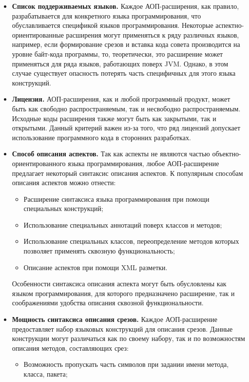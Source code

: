 \begin{itemize}
\item \textbf{Список поддерживаемых языков.}
  Каждое АОП-расширения, как правило, разрабатывается для конкретного языка
  программирования, что обуславливается спецификой языков программирования.
  Некоторые аспектно-ориентированные расширения могут применяться
  к ряду различных языков, например, если формирование срезов и вставка кода
  совета производится на уровне байт-кода программы, то, теоретически, это
  расширение может применяться для ряда языков, работающих поверх JVM.
  Однако, в этом случае существует опасность потерять часть специфичных для
  этого языка конструкций.
\item \textbf{Лицензия.}
  АОП-расширения, как и любой программный продукт, может быть как свободно
  распространяемым, так и несвободно распространяемым.
  Исходные коды расширения также могут быть как закрытыми, так и открытыми.
  Данный критерий важен из-за того, что ряд лицензий допускает использование
  программного кода в сторонних разработках.
\item \textbf{Способ описания аспектов.}
  Так как аспекты не являются частью объектно-ориентированного языка
  программирования, любое АОП-расширение предлагает некоторый синтаксис описания аспектов.
  К популярным способам описания аспектов можно отнести:
  \begin{itemize}
      \item Расширение синтаксиса языка программирования при помощи специальных конструкций;
      \item Использование специальных аннотаций поверх классов и методов;
      \item Использование специальных классов, переопределение методов которых позволяет применять сквозную функциональность;
      \item Описание аспектов при помощи XML разметки.
  \end{itemize}
  Особенности синтаксиса описания аспекта могут быть обусловлены как языком
  программирования, для которого предназначено расширение, так и соображениями
  удобства описания сквозной функциональности.
\item \textbf{Мощность синтаксиса описания срезов.}
  Каждое АОП-расширение предоставляет набор языковых конструкций для описания срезов.
  Данные конструкции могут различаться как по своему набору, так и по возможностям описания методов, составляющих срез:
  \begin{itemize}
      \item Возможность пропускать часть символов при задании имени метода, класса, пакета;

\end{itemize}
\end{itemize}
